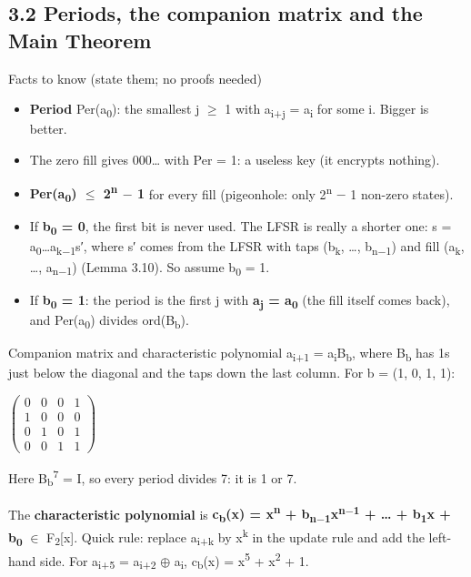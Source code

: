 \documentclass[11pt,a4paper]{article}
\begin{document}
\subsection*{3.2 Periods, the companion matrix and the Main Theorem}\label{ch3-period}
\begin{concept}{Facts to know (state them; no proofs needed)}
\begin{itemize}
\item \textbf{Period} Per(a\textsubscript{0}): the smallest j \ensuremath{\ge} 1 with a\textsubscript{i+j} = a\textsubscript{i} for some i. Bigger is better.
\item The zero fill gives 000\ldots{} with Per = 1: a useless key (it encrypts nothing).
\item \textbf{Per(a\textsubscript{0}) \ensuremath{\le} 2\textsuperscript{n} \ensuremath{-} 1} for every fill (pigeonhole: only 2\textsuperscript{n} \ensuremath{-} 1 non-zero states).
\item If \textbf{b\textsubscript{0} = 0}, the first bit is never used. The LFSR is really a shorter one: s = a\textsubscript{0}\ldots{}a\textsubscript{k\ensuremath{-}1}s′, where s′ comes from the LFSR with taps (b\textsubscript{k}, \ldots{}, b\textsubscript{n\ensuremath{-}1}) and fill (a\textsubscript{k}, \ldots{}, a\textsubscript{n\ensuremath{-}1}) (Lemma 3.10). So assume b\textsubscript{0} = 1.
\item If \textbf{b\textsubscript{0} = 1}: the period is the first j with \textbf{a\textsubscript{j} = a\textsubscript{0}} (the fill itself comes back), and Per(a\textsubscript{0}) divides ord(B\textsubscript{b}).
\end{itemize}
\end{concept}
\begin{concept}{Companion matrix and characteristic polynomial}
a\textsubscript{i+1} = a\textsubscript{i}B\textsubscript{b}, where B\textsubscript{b} has 1s just below the diagonal and the taps down the last column. For b = (1, 0, 1, 1):\par
\ensuremath{\begin{pmatrix}0&0&0&1\\1&0&0&0\\0&1&0&1\\0&0&1&1\end{pmatrix}}\par
Here B\textsubscript{b}\textsuperscript{7} = I, so every period divides 7: it is 1 or 7.\par
The \textbf{characteristic polynomial} is \textbf{c\textsubscript{b}(x) = x\textsuperscript{n} + b\textsubscript{n\ensuremath{-}1}x\textsuperscript{n\ensuremath{-}1} + \ldots{} + b\textsubscript{1}x + b\textsubscript{0}} \ensuremath{\in} F\textsubscript{2}[x]. Quick rule: replace a\textsubscript{i+k} by x\textsuperscript{k} in the update rule and add the left-hand side. For a\textsubscript{i+5} = a\textsubscript{i+2} \ensuremath{\oplus} a\textsubscript{i}, c\textsubscript{b}(x) = x\textsuperscript{5} + x\textsuperscript{2} + 1.\par
\end{concept}
\end{document}
